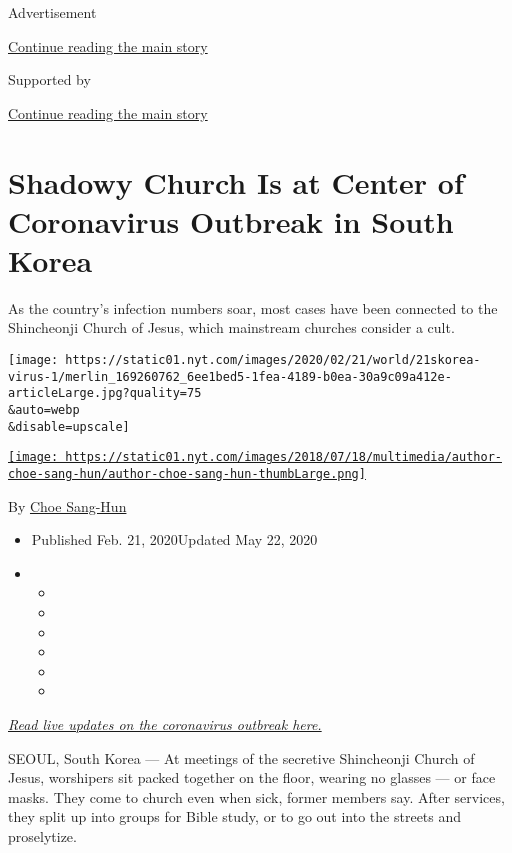 Advertisement

\protect\hyperlink{after-top}{Continue reading the main story}

Supported by

\protect\hyperlink{after-sponsor}{Continue reading the main story}

\hypertarget{shadowy-church-is-at-center-of-coronavirus-outbreak-in-south-korea}{%
\section{Shadowy Church Is at Center of Coronavirus Outbreak in South
Korea}\label{shadowy-church-is-at-center-of-coronavirus-outbreak-in-south-korea}}

As the country's infection numbers soar, most cases have been connected
to the Shincheonji Church of Jesus, which mainstream churches consider a
cult.

\texttt{[image: https://static01.nyt.com/images/2020/02/21/world/21skorea-virus-1/merlin\_169260762\_6ee1bed5-1fea-4189-b0ea-30a9c09a412e-articleLarge.jpg?quality=75\\\&auto=webp\\\&disable=upscale]}

\href{https://www.nytimes.com/by/choe-sang-hun}{\texttt{[image: https://static01.nyt.com/images/2018/07/18/multimedia/author-choe-sang-hun/author-choe-sang-hun-thumbLarge.png]}}

By \href{https://www.nytimes.com/by/choe-sang-hun}{Choe Sang-Hun}

\begin{itemize}
\item
  Published Feb. 21, 2020Updated May 22, 2020
\item
  \begin{itemize}
  \item
  \item
  \item
  \item
  \item
  \item
  \end{itemize}
\end{itemize}

\href{http://www.nytimes.com/2020/03/04/world/coronavirus-news.html}{\emph{Read
live updates on the coronavirus outbreak here.}}

SEOUL, South Korea --- At meetings of the secretive Shincheonji Church
of Jesus, worshipers sit packed together on the floor, wearing no
glasses --- or face masks. They come to church even when sick, former
members say. After services, they split up into groups for Bible study,
or to go out into the streets and proselytize.

